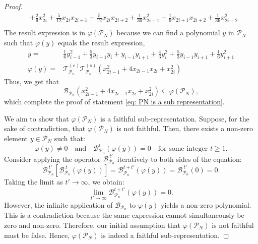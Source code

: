 \documentclass[showpacs,onecolumn,aps,prx,long bibliography,superscriptaddress,notitlepage]{revtex4-1}
\newcommand{\Tcal}{\mathcal{T}}
\begin{document}
\begin{proof}
\begin{equation}
\begin{aligned}
        & + \frac{2}{9}x_{2i}^2 + \frac{5}{12} x_{2i}x_{2i+1} + \frac{5}{12} x_{2i}x_{2i+2} + \frac{1}{36}x_{2i+1}^2  + \frac{1}{9} x_{2i+1}x_{2i+2}+ \frac{1}{36}x_{2i+2}^2 \\
    \end{aligned}
    \end{equation}
    The result expression is in $\varphi(\mathcal{P}_N)$ because we can find a polynomial $y$ in $\mathcal{P}_N$ such that $\varphi(y)$ equals the result expression,
    \begin{align}
        y =& \frac{1}{6} y_{i-1}^2 + \frac{5}{3} y_{i-1}y_{i} + y_{i-1}y_{i+1} + \frac{4}{3} y_{i}^2 + \frac{5}{3} y_{i-1}y_{i+1}  + \frac{1}{6} y_{i+1}^2 \\
        \varphi(y) =& \Tcal^{(e)}_{\mathcal{P}_n}\Tcal^{(o)}_{\mathcal{P}_n} ( x_{2i-1}^2+4 x_{2i-1} x_{2i}+x_{2i}^2)
    \end{align}
    Thus, we get that 
    \begin{equation}
        \mathcal{B}_{\mathcal{P}_n} ( x_{2i-1}^2+4 x_{2i-1} x_{2i}+x_{2i}^2) \subseteq \varphi(\mathcal{P}_N),
    \end{equation}
    which complete the proof of statement \ref{eq: PN is a sub representation}.

We aim to show that $\varphi(\mathcal{P}_N)$ is a faithful sub-representation. Suppose, for the sake of contradiction, that $\varphi(\mathcal{P}_N)$ is not faithful. Then, there exists a non-zero element $y \in \mathcal{P}_N$ such that:
\[
\varphi(y) \neq 0 \quad \text{and} \quad \mathcal{B}_{\mathcal{P}_n}^t (\varphi(y)) = 0 \quad \text{for some integer } t \geq 1.
\]
Consider applying the operator $\mathcal{B}_{\mathcal{P}_n}^{~t'}$ iteratively to both sides of the equation:
\[
\mathcal{B}_{\mathcal{P}_n}^{~t'} \left[ \mathcal{B}_{\mathcal{P}_n}^{~t} (\varphi(y)) \right] = \mathcal{B}_{\mathcal{P}_n}^{t + t'} (\varphi(y)) = \mathcal{B}_{\mathcal{P}_n}^{~t'} (0) = 0.
\]
Taking the limit as $t' \to \infty$, we obtain:
\[
\lim_{t' \to \infty} \mathcal{B}_{\mathcal{P}_n}^{t + t'} (\varphi(y)) = 0.
\]
However, the infinite application of $\mathcal{B}_{\mathcal{P}_n}$ to $\varphi(y)$ yields a non-zero polynomial.
This is a contradiction because the same expression cannot simultaneously be zero and non-zero. Therefore, our initial assumption that $\varphi(\mathcal{P}_N)$ is not faithful must be false. 
Hence, $\varphi(\mathcal{P}_N)$ is indeed a faithful sub-representation.

\end{proof}
\end{document}
